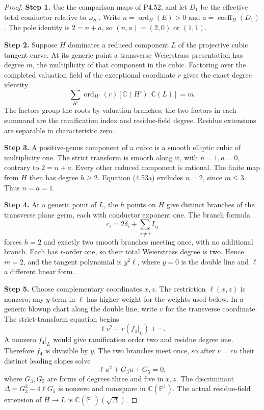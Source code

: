 \begin{proof}
\noindent\textbf{Step 1.} Use the comparison maps of P4.52, and let $D_1$ be the
effective total conductor relative to $\omega_{S_1}$.
Write $n=\operatorname{ord}_H(E)>0$ and
$a=\operatorname{coeff}_H(D_1)$. The pole identity is
$2=n+a$, so $(n,a)=(2,0)$ or $(1,1)$.

\noindent\textbf{Step 2.} Suppose $H$ dominates a reduced component $L$ of the
projective cubic tangent curve. At its generic point
a transverse Weierstrass presentation has degree
$m$, the multiplicity of that component in the cubic.
Factoring over the completed valuation field of the
exceptional coordinate $r$ gives the exact degree
identity
\[
 \sum_{H'}\operatorname{ord}_{H'}(r)
                 [\mathbb C(H'):\mathbb C(L)]=m.             \tag{4.53a}
\]
The factors group the roots by valuation branches;
the two factors in each summand are the ramification
index and residue-field degree. Residue extensions
are separable in characteristic zero.

\noindent\textbf{Step 3.} A positive-genus component of a cubic is a smooth
elliptic cubic of multiplicity one. The strict
transform is smooth along it, with $n=1,a=0$,
contrary to $2=n+a$. Every other reduced component
is rational. The finite map from $H$ then has degree
$h\ge2$. Equation (4.53a) excludes $n=2$, since
$m\le3$. Thus $n=a=1$.

\noindent\textbf{Step 4.} At a generic point of $L$, the $h$ points on $H$
give distinct branches of the transverse plane germ,
each with conductor exponent one. The branch formula
\[
             c_i=2\delta_i+\sum_{j\ne i}I_{ij}
\]
forces $h=2$ and exactly two smooth branches meeting
once, with no additional branch. Each has $r$-order
one, so their total Weierstrass degree is two. Hence
$m=2$, and the tangent polynomial is $y^2\ell$,
where $y=0$ is the double line and $\ell$ a different
linear form.

\noindent\textbf{Step 5.} Choose complementary coordinates $x,z$. The
restriction $\ell(x,z)$ is nonzero; any $y$ term in
$\ell$ has higher weight for the weights used below.
In a generic blowup chart along the double line,
write $v$ for the transverse coordinate. The
strict-transform equation begins
\[
                 \ell v^2+r(f_4|_L)+\cdots.
\]
A nonzero $f_4|_L$ would give ramification order two
and residue degree one. Therefore $f_4$ is divisible
by $y$. The two branches meet once, so after
$v=ru$ their distinct leading slopes solve
\[
                         \ell u^2+G_3u+G_5=0,
\]
where $G_3,G_5$ are forms of degrees three and five
in $x,z$. The discriminant
$\Delta=G_3^2-4\ell G_5$ is nonzero and nonsquare
in $\mathbb C(\mathbb P^1)$. The actual residue-field
extension of $H\to L$ is
$\mathbb C(\mathbb P^1)(\sqrt\Delta)$.


\end{proof}
